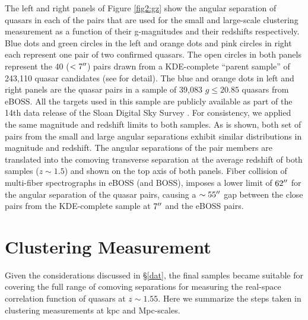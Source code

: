 \documentclass[useAMS,usenatbib]{mn2e}
\begin{document}
The left and right panels of Figure \ref{fig2:gz} show the angular separation of quasars in each of the pairs that are 
used for the small and large-scale clustering measurement as a function of their 
g-magnitudes and their redshifts respectively. Blue dots and green circles in 
the left and orange dots and pink circles in right each represent one pair of 
two confirmed quasars. The open circles in both panels represent the 40 ($< 7 
\arcsec$) pairs drawn from a KDE-complete ``parent sample'' of  243{,}110 quasar 
candidates (see \citet{ef17} for detail). The blue and orange dots in left and 
right panels are the quasar pairs in a sample of 39{,}083 $g\le 20.85$ quasars 
from eBOSS. All the targets used in this sample are publicly available as part of the 14th data release of the Sloan Digital Sky Survey \citep[DR14; ][]{dr14}. For consistency, we applied the same magnitude and redshift limits to both samples. 
As is shown, both set of pairs from the small and large angular separations 
exhibit similar distributions in magnitude and redshift. 
The angular separations of the pair members are translated into the 
comoving transverse separation at the average redshift of both samples ($z\sim 
1.5$) and shown on the top axis of both panels. Fiber collision of multi-fiber 
spectrographs in eBOSS (and BOSS), imposes a lower limit of $62\arcsec$ for the 
angular separation of the quasar pairs, causing a $\sim 55\arcsec$ gap between 
the close pairs from the KDE-complete sample at $7\arcsec$ and the eBOSS 
pairs.




\section{Clustering Measurement}\label{cls}
Given the considerations discussed in \S\ref{dat}, the final samples became 
suitable for covering the full range of comoving separations for measuring the 
real-space correlation function of quasars at $z\sim 1.55$.  Here we summarize 
the steps taken in clustering measurements at kpc and Mpc-scales.
\end{document}
